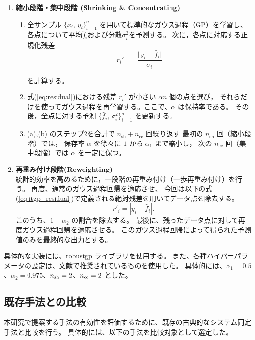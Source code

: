 \begin{enumerate}
  \item \textbf{縮小段階・集中段階 (Shrinking \& Concentrating)}\\
\begin{enumerate}
  \item 全サンプル $\{x_i,\,y_i\}_{i=1}^n$ を用いて標準的なガウス過程（GP）を学習し、
  各点について平均$\hat{f}_i$および分散$\sigma_i^2$を予測する。
  次に，各点に対応する正規化残差
  {\small
    \begin{equation}
        \label{eq:residual}
        r_i' \;=\; \frac{\bigl|\,y_i - \hat{f}_i\bigr|}{\sigma_i}
    \end{equation}
  }

    を計算する。

  \item 式(\ref{eq:residual})における残差 $r_i'$ が小さい $\alpha n$ 個の点を選び，
  それらだけを使ってガウス過程を再学習する。ここで、$\alpha$ は保持率である。
  その後，全点に対する予測 $\{\hat{f}_i,\,\sigma_i^2\}_{i=1}^n$ を更新する。


  \item (a),(b) のステップ2を合計で $n_{\mathrm{sh}} + n_{\mathrm{cc}}$ 回繰り返す
  最初の $n_{\mathrm{sh}}$ 回（縮小段階）では，
  保存率 $\alpha$ を徐々に $1$ から $\alpha_1$ まで縮小し，
  次の $n_{\mathrm{cc}}$ 回（集中段階）では $\alpha$ を一定に保つ。
\end{enumerate}
  \item \textbf{再重み付け段階(Reweighting)}\\
統計的効率を高めるために，一段階の再重み付け（一歩再重み付け）を行う。
再度、通常のガウス過程回帰を適応させ、
今回は以下の式(\ref{eq:itgp_residual})で定義される絶対残差を用いてデータ点を除去する。
{\small
\begin{equation}
        r'_i = |y_i - \hat{f}_i|.
        \label{eq:itgp_residual}
\end{equation}
}
このうち、$1 - \alpha_2$ の割合を除去する。
最後に、残ったデータ点に対して再度ガウス過程回帰を適応させる。
このガウス過程回帰によって得られた予測値のみを最終的な出力とする。
\end{enumerate}
具体的な実装には、robustgp ライブラリを使用する。
また、各種ハイパーパラメータの設定は、文献\cite{Li2021}で推奨されているものを使用した。
具体的には、$\alpha_1 = 0.5$、$\alpha_2 = 0.975$、$n_{\rm sh} = 2$、$n_{\rm cc} = 2$ とした。

\subsection{既存手法との比較}
\label{sec:comparison_existing_methods}
本研究で提案する手法の有効性を評価するために、既存の古典的なシステム同定手法と比較を行う。
具体的には、以下の手法を比較対象として選定した。
